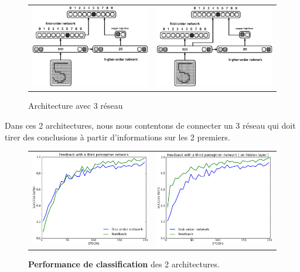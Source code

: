 \documentclass[a4paper,12pt, twoside]{article}
\begin{document}
\begin{figure}[H]
 \begin{center}
\begin{tabular}{c|c}
 \includegraphics[width=210px]{../pre-presentation/thrid.png} & 
 \includegraphics[width=210px]{../pre-presentation/thrid_hidden.png}
\end{tabular}
\end{center}
\caption{Architecture avec 3 réseau}
\end{figure}

Dans ces 2 architectures, nous nous contentons de connecter un 3 réseau qui doit 
tirer des conclusions à partir d'informations sur les 2 premiers.

\begin{figure}[H]
 \begin{center}
\begin{tabular}{c|c}
 \includegraphics[width=210px]{third_net.png} & 
 \includegraphics[width=210px]{third_net_hidden.png}
\end{tabular}
\end{center}
\caption{\textbf{Performance de classification} des 2 architectures.}
\end{figure}
\end{document}

